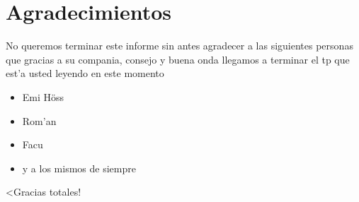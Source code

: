 \section{Agradecimientos}

	No queremos terminar este informe sin antes agradecer a las siguientes personas que gracias a su compania, consejo y buena onda llegamos a terminar el tp que est'a usted leyendo en este momento
\begin{itemize}
 \item Emi H\"oss
 \item Rom'an
 \item Facu
 \item y a los mismos de siempre
\end{itemize}

	<Gracias totales!
